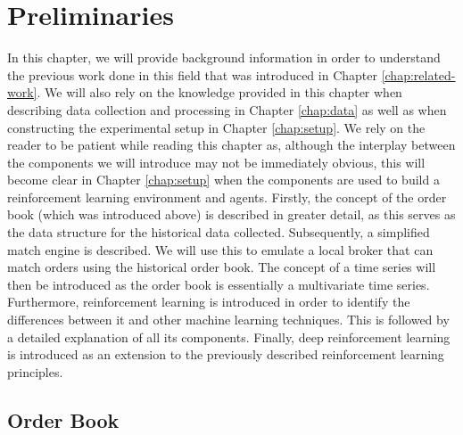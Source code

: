 \chapter{Preliminaries}
\label{chap:preliminaries}

In this chapter, we will provide background information in order to understand the previous work done in this field that was introduced in Chapter \ref{chap:related-work}.
We will also rely on the knowledge provided in this chapter when describing data collection and processing in Chapter \ref{chap:data} as well as when constructing the experimental setup in Chapter \ref{chap:setup}.
We rely on the reader to be patient while reading this chapter as, although the interplay between the components we will introduce may not be immediately obvious, this will become clear in Chapter \ref{chap:setup} when the components are used to build a reinforcement learning environment and agents. 
Firstly, the concept of the order book (which was introduced above) is described in greater detail, as this serves as the data structure for the  historical data collected.
Subsequently, a simplified match engine is described. We will use this to emulate a local broker that can match orders using the historical order book.
The concept of a time series will then be introduced as the order book is essentially a multivariate time series.
Furthermore, reinforcement learning is introduced in order to identify the differences between it and other machine learning techniques. This is followed by a detailed explanation of all its components.
Finally, deep reinforcement learning is introduced as an extension to the previously described reinforcement learning principles.

\section{Order Book}

